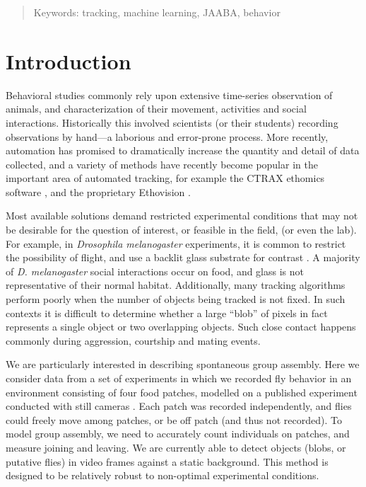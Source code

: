 \documentclass[11pt]{article}
\begin{document}
{\begin{abstract}
 \vspace*{0.1in}
 Keywords: tracking, machine learning, JAABA, behavior
 
 \vspace*{0.1in}
 

\end{abstract}

\vspace*{-0.3in}
\section*{Introduction}\label{s:intro}
\vspace*{-0.15in}

Behavioral studies commonly rely upon extensive time-series observation of animals, and characterization of their movement, activities and social interactions. Historically this involved scientists (or their students) recording observations by hand---a laborious and error-prone process. More recently, automation has promised to dramatically increase the quantity and detail of data collected, and a variety of methods have recently become popular in the important area of automated tracking, for example the CTRAX ethomics software \cite{ctrax}, and the proprietary Ethovision \cite{ethovision}. 

Most available solutions demand restricted experimental conditions that may not be desirable for the question of interest, or feasible in the field, (or even the lab). For example, in \emph{Drosophila melanogaster} experiments, it is common to restrict the possibility of flight, and use a backlit glass substrate for contrast \cite{ctrax}. A majority of \emph{D. melanogaster} social interactions occur on food, and glass is not representative of their normal habitat. Additionally, many tracking algorithms perform poorly when the number of objects being tracked is not fixed. In such contexts it is difficult to determine whether a large ``blob'' of pixels in fact represents a single object or two overlapping objects. Such close contact happens commonly during aggression, courtship and mating events. 

We are particularly interested in describing spontaneous group assembly. Here we consider data from a set of experiments in which we recorded fly behavior in an environment consisting of four food patches, modelled on a published experiment conducted with still cameras \cite{Saltz:2011}. Each patch was recorded independently, and flies could freely move among patches, or be off patch (and thus not recorded). To model group assembly, we need to accurately count individuals on patches, and measure joining and leaving. We are currently able to detect objects (blobs, or putative flies) in video frames against a static background. This method is designed to be relatively robust to non-optimal experimental conditions.

}
\end{document}
